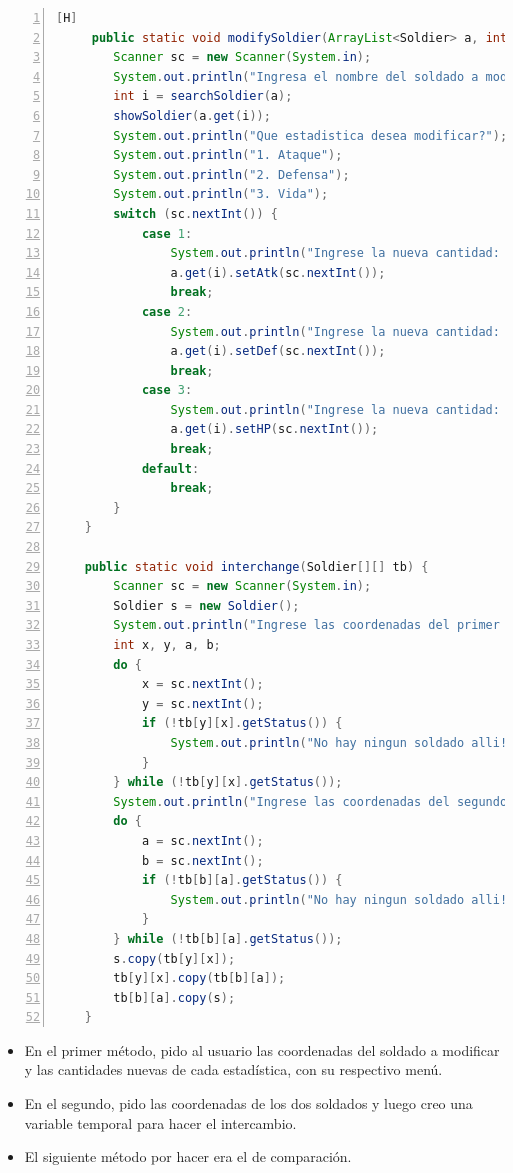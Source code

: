 \documentclass{article}
\begin{document}
	\begin{lstlisting}[language=java,caption={Métodos especiales}, numbers=left][H]
	 public static void modifySoldier(ArrayList<Soldier> a, int id, Soldier[][] tb) {
        Scanner sc = new Scanner(System.in);
        System.out.println("Ingresa el nombre del soldado a modificar: ");
        int i = searchSoldier(a);
        showSoldier(a.get(i));
        System.out.println("Que estadistica desea modificar?");
        System.out.println("1. Ataque");
        System.out.println("2. Defensa");
        System.out.println("3. Vida");
        switch (sc.nextInt()) {
            case 1:
                System.out.println("Ingrese la nueva cantidad: ");
                a.get(i).setAtk(sc.nextInt());
                break;
            case 2:
                System.out.println("Ingrese la nueva cantidad: ");
                a.get(i).setDef(sc.nextInt());
                break;
            case 3:
                System.out.println("Ingrese la nueva cantidad: ");
                a.get(i).setHP(sc.nextInt());
                break;
            default:
                break;
        }
    }

    public static void interchange(Soldier[][] tb) {
        Scanner sc = new Scanner(System.in);
        Soldier s = new Soldier();
        System.out.println("Ingrese las coordenadas del primer soldado (x, y)");
        int x, y, a, b;
        do {
            x = sc.nextInt();
            y = sc.nextInt();
            if (!tb[y][x].getStatus()) {
                System.out.println("No hay ningun soldado alli!");
            }
        } while (!tb[y][x].getStatus());
        System.out.println("Ingrese las coordenadas del segundo soldado");
        do {
            a = sc.nextInt();
            b = sc.nextInt();
            if (!tb[b][a].getStatus()) {
                System.out.println("No hay ningun soldado alli!");
            }
        } while (!tb[b][a].getStatus());
        s.copy(tb[y][x]);
        tb[y][x].copy(tb[b][a]);
        tb[b][a].copy(s);
    }
	\end{lstlisting}
	\begin{itemize}	
		\item En el primer método, pido al usuario las coordenadas del soldado a modificar y las cantidades nuevas de cada estadística, con su respectivo menú.
		\item En el segundo, pido las coordenadas de los dos soldados y luego creo una variable temporal para hacer el intercambio.
		\item El siguiente método por hacer era el de comparación.
	\end{itemize}
\end{document}
